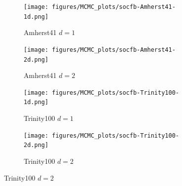   \begin{figure}
    \centering

    \begin{subfigure}{0.49\textwidth}
      \centering
      \texttt{[image: figures/MCMC\_plots/socfb-Amherst41-1d.png]}
      \caption{Amherst41 $d=1$}
    \end{subfigure}
    \hfill
    \begin{subfigure}{0.49\textwidth}
      \centering
      \texttt{[image: figures/MCMC\_plots/socfb-Amherst41-2d.png]}
      \caption{Amherst41 $d=2$}
    \end{subfigure}
  
    \vspace{1em}

    \begin{subfigure}{0.49\textwidth}
      \centering
      \texttt{[image: figures/MCMC\_plots/socfb-Trinity100-1d.png]}
      \caption{Trinity100 $d=1$}
    \end{subfigure}
    \hfill
    \begin{subfigure}{0.49\textwidth}
      \centering
      \texttt{[image: figures/MCMC\_plots/socfb-Trinity100-2d.png]}
      \caption{Trinity100 $d=2$}
    \end{subfigure}
  

\end{figure}
